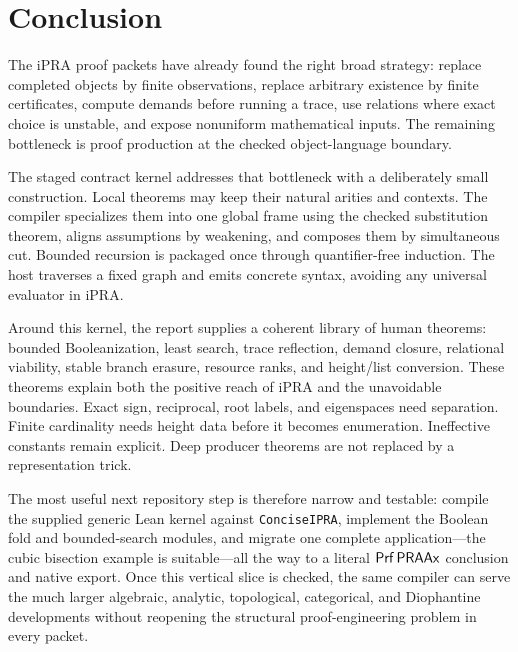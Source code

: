 \section{Conclusion}

The iPRA proof packets have already found the right broad strategy: replace completed objects by finite
observations, replace arbitrary existence by finite certificates, compute demands before running a trace,
use relations where exact choice is unstable, and expose nonuniform mathematical inputs.  The remaining
bottleneck is proof production at the checked object-language boundary.

The staged contract kernel addresses that bottleneck with a deliberately small construction.  Local
theorems may keep their natural arities and contexts.  The compiler specializes them into one global frame
using the checked substitution theorem, aligns assumptions by weakening, and composes them by simultaneous
cut.  Bounded recursion is packaged once through quantifier-free induction.  The host traverses a fixed graph
and emits concrete syntax, avoiding any universal evaluator in iPRA.

Around this kernel, the report supplies a coherent library of human theorems: bounded Booleanization,
least search, trace reflection, demand closure, relational viability, stable branch erasure, resource ranks,
and height/list conversion.  These theorems explain both the positive reach of iPRA and the unavoidable
boundaries.  Exact sign, reciprocal, root labels, and eigenspaces need separation.  Finite cardinality needs
height data before it becomes enumeration.  Ineffective constants remain explicit.  Deep producer theorems
are not replaced by a representation trick.

The most useful next repository step is therefore narrow and testable: compile the supplied generic Lean
kernel against \texttt{ConciseIPRA}, implement the Boolean fold and bounded-search modules, and migrate one
complete application---the cubic bisection example is suitable---all the way to a literal
\(\mathsf{Prf}\,\mathsf{PRAAx}\) conclusion and native export.  Once this vertical slice is checked, the same compiler can
serve the much larger algebraic, analytic, topological, categorical, and Diophantine developments without
reopening the structural proof-engineering problem in every packet.
